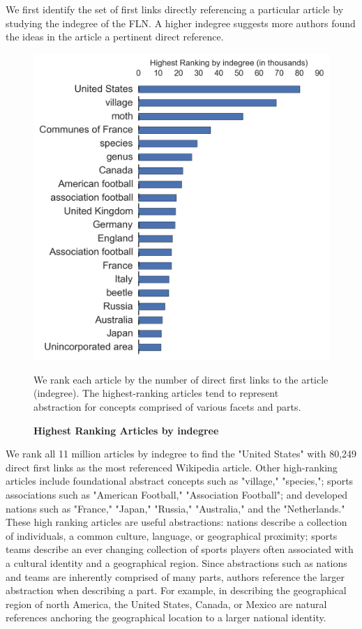 \documentclass[pre,twocolumn,twoside,superscriptaddress,floatfix, aps, 10pt]{revtex4-1}
\begin{document}
We first identify the set of first links directly referencing a particular article 
by studying the indegree of the FLN. 
A higher indegree suggests more authors found the ideas in the article 
a pertinent direct reference. 
\begin{figure}[tp!]
  \centering	
  \includegraphics[width=\columnwidth]{graphics/articles_ndegree.png}
  \caption{
    \textbf{Highest Ranking Articles by indegree}
  }
  We rank each article by the number of direct first links to the article (indegree). The highest-ranking articles tend to represent abstraction for concepts
  comprised of various facets and parts.
  \label{fig:ndegree list}
\end{figure}
We rank all 11 million articles by indegree to find 
the "United States" with 80,249 direct first links as the most referenced
Wikipedia article. 
Other high-ranking articles
include foundational abstract concepts such as "village," "species,"; 
sports associations such as "American Football," "Association Football"; 
and developed nations such as "France," "Japan," "Russia," "Australia," and 
the "Netherlands." These high ranking articles are useful abstractions: nations
describe a collection of individuals, a common culture, language, or 
geographical proximity; sports teams describe an ever changing collection of 
sports players often associated with a cultural identity and a geographical 
region. Since abstractions such as nations and teams are inherently comprised
of many parts, authors reference the larger abstraction when describing 
a part. For example, in describing the geographical region of north America, 
the United States, Canada, or Mexico are natural references anchoring the 
geographical location to a larger national identity. 
\end{document}
